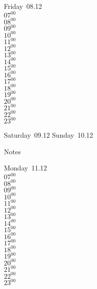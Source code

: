 \documentclass[11pt, a4paper]{book}\usepackage[]{graphicx}\usepackage[]{color}
\begin{document}
\begin{weekdaybox}
  Friday~08.12\\
  { 
  \vfill
  $07^{00}$\\
$08^{00}$\\
$09^{00}$\\
$10^{00}$\\
$11^{00}$\\
$12^{00}$\\
$13^{00}$\\
$14^{00}$\\
$15^{00}$\\
$16^{00}$\\
$17^{00}$\\
$18^{00}$\\
$19^{00}$\\
$20^{00}$\\
$21^{00}$\\
$22^{00}$\\
$23^{00}$\\
  }
\end{weekdaybox}
\begin{weekendbox}
  Saturday~09.12
  \tcblower
  Sunday~10.12
\end{weekendbox} %
\begin{notebox}
  Notes
\end{notebox}
\clearpage
\begin{headerbox}
\end{headerbox}
\begin{weekdaybox}
  Monday~11.12\\
  { 
  \vfill
  $07^{00}$\\
$08^{00}$\\
$09^{00}$\\
$10^{00}$\\
$11^{00}$\\
$12^{00}$\\
$13^{00}$\\
$14^{00}$\\
$15^{00}$\\
$16^{00}$\\
$17^{00}$\\
$18^{00}$\\
$19^{00}$\\
$20^{00}$\\
$21^{00}$\\
$22^{00}$\\
$23^{00}$\\
  }
\end{weekdaybox}
\end{document}
